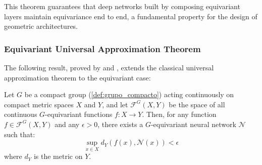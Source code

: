 This theorem guarantees that deep networks built by composing equivariant layers maintain equivariance end to end, a fundamental property for the design of geometric architectures.

\subsubsection{Equivariant Universal Approximation Theorem}\label{sec:teorema_equivariante}

The following result, proved by \citet{yarotsky2022} and \citet{kondor2018generalizationconvolutionalneural}, extends the classical universal approximation theorem to the equivariant case:

\begin{theorem}\label{theorem:universal_approximation_equivariant}
Let $G$ be a compact group (\autoref{def:grupo_compacto}) acting continuously on compact metric spaces $X$ and $Y$, and let $\mathcal{F}^G(X,Y)$ be the space of all continuous $G$-equivariant functions $f: X \rightarrow Y$. Then, for any function $f \in \mathcal{F}^G(X,Y)$ and any $\epsilon > 0$, there exists a $G$-equivariant neural network $\mathcal{N}$ such that:
\begin{equation}
\sup_{x \in X} d_Y(f(x), \mathcal{N}(x)) < \epsilon
\label{eq:universal_approximation_equivariant}
\end{equation}
where $d_Y$ is the metric on $Y$.
\end{theorem}

